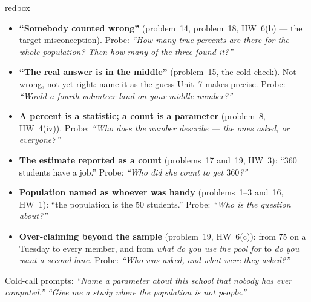 \documentclass[10pt]{article}
\begin{document}
\boxguard
\begin{skillbox}{redbox}
\begin{itemize}[leftmargin=1.2em, nosep]
  \item \textbf{``Somebody counted wrong''} (problem~14, problem~18, HW~6(b) --- the target
        misconception). Probe: \emph{``How many true percents are there for the whole
        population? Then how many of the three found it?''}
  \item \textbf{``The real answer is in the middle''} (problem~15, the cold check). Not wrong,
        not yet right: name it as the guess Unit~7 makes precise. Probe: \emph{``Would a fourth
        volunteer land on your middle number?''}
  \item \textbf{A percent is a statistic; a count is a parameter} (problem~8, HW~4(iv)).
        Probe: \emph{``Who does the number describe --- the ones asked, or everyone?''}
  \item \textbf{The estimate reported as a count} (problems~17 and~19, HW~3): ``$360$
        students have a job.'' Probe: \emph{``Who did she count to get $360$?''}
  \item \textbf{Population named as whoever was handy} (problems~1--3 and~16, HW~1): ``the
        population is the $50$ students.'' Probe: \emph{``Who is the question \emph{about}?''}
  \item \textbf{Over-claiming beyond the sample} (problem~19, HW~6(c)): from $75$ on a Tuesday to
        every member, and from \emph{what do you use the pool for} to \emph{do you want a
        second lane}. Probe: \emph{``Who was asked, and what were they asked?''}
\end{itemize}
Cold-call prompts: \emph{``Name a parameter about this school that nobody has ever
computed.''} \quad \emph{``Give me a study where the population is not people.''}
\end{skillbox}
\end{document}
